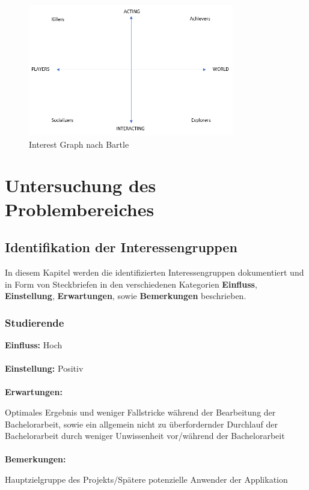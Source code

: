 \documentclass{scrreprt}
\begin{document}
\begin{figure}[H]
	\centering
	\includegraphics[width=0.8\textwidth, keepaspectratio]{Bilder/Diagramme/InterestGraphBartle.png}
	\caption{Interest Graph nach Bartle \cite{bartle1996hearts}}
	\label{img:interetGraphBartle}
\end{figure}

\chapter{Untersuchung des Problembereiches} \label{chap:problemanalyse}
\section{Identifikation der Interessengruppen}
\par In diesem Kapitel werden die identifizierten Interessengruppen dokumentiert und in Form von Steckbriefen in den verschiedenen Kategorien \textbf{Einfluss}, \textbf{Einstellung}, \textbf{Erwartungen}, sowie \textbf{Bemerkungen} beschrieben.  
\subsection{Studierende}
\textbf{Einfluss:} Hoch\\\\
\textbf{Einstellung:} Positiv\\\\
\textbf{Erwartungen:}\par Optimales Ergebnis und weniger \glqq Fallstricke\grqq{} während der Bearbeitung der Bachelorarbeit, sowie ein allgemein \glqq nicht zu überfordernder\grqq{} Durchlauf der Bachelorarbeit durch weniger Unwissenheit vor/während der Bachelorarbeit\\\\
\textbf{Bemerkungen:}\par Hauptzielgruppe des Projekts/Spätere potenzielle Anwender der Applikation
\end{document}

